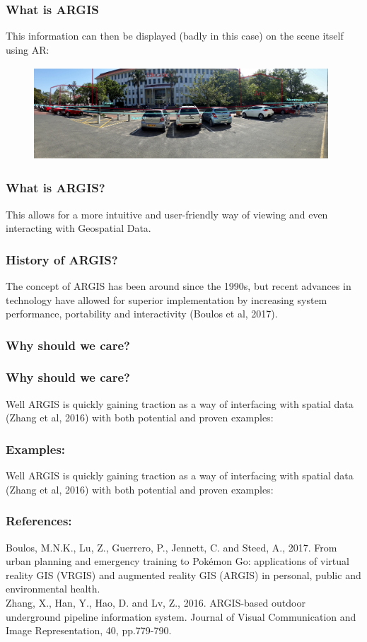 \documentclass[10pt, compress]{beamer}
\begin{document}
\begin{frame}[fragile]
  \frametitle{What is ARGIS}
  This information can then be displayed (badly in this case) on the scene itself using AR:
\begin{figure}
  \centering
 \includegraphics[width=11cm,height=3.5cm]{3.jpg}
\end{figure}
\end{frame}

\begin{frame}[fragile]
\frametitle{What is ARGIS?}
This allows for a more intuitive and user-friendly way of viewing and even interacting with Geospatial Data.

\end{frame}

\begin{frame}[fragile]
\frametitle{History of ARGIS?}
The concept of ARGIS has been around since the 1990s, but recent advances in technology have allowed for superior implementation by increasing system performance, portability and interactivity (Boulos et al, 2017).
\end{frame}

\begin{frame}[fragile]
\frametitle{Why should we care?}
\end{frame}

\begin{frame}[fragile]
\frametitle{Why should we care?}
Well ARGIS is quickly gaining traction as a way of interfacing with spatial data (Zhang et al, 2016) with both potential and proven examples:
\end{frame}

\begin{frame}[fragile]
\frametitle{Examples:}
Well ARGIS is quickly gaining traction as a way of interfacing with spatial data (Zhang et al, 2016) with both potential and proven examples:
\end{frame}

\begin{frame}[fragile]
\frametitle{References:}
Boulos, M.N.K., Lu, Z., Guerrero, P., Jennett, C. and Steed, A., 2017. From urban planning and emergency training to Pokémon Go: applications of virtual reality GIS (VRGIS) and augmented reality GIS (ARGIS) in personal, public and environmental health.\\

Zhang, X., Han, Y., Hao, D. and Lv, Z., 2016. ARGIS-based outdoor underground pipeline information system. Journal of Visual Communication and Image Representation, 40, pp.779-790.
\end{frame}
\end{document}
